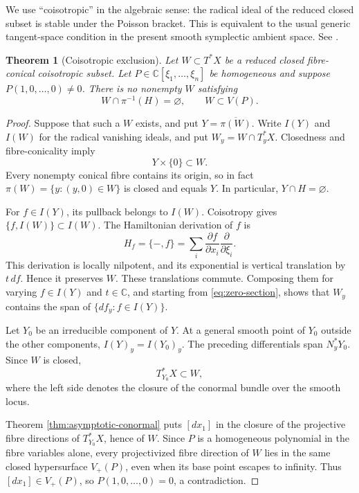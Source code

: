 \documentclass[11pt]{amsart}
\newtheorem{theorem}{Theorem}[section]
\theoremstyle{definition}
\begin{document}
We use ``coisotropic'' in the algebraic sense: the radical ideal of the
reduced closed subset is stable under the Poisson bracket. This is equivalent
to the usual generic tangent-space condition in the present smooth symplectic
ambient space. See \cite[Lemma~11.9]{SchnellNotes}.

\begin{theorem}[Coisotropic exclusion]\label{thm:coisotropic-exclusion}
Let $W\subset T^*X$ be a reduced closed fibre-conical coisotropic subset. Let
$P\in \mathbb C[\xi_1,\ldots,\xi_n]$ be homogeneous and suppose
$P(1,0,\ldots,0)\neq0$.
There is no nonempty $W$ satisfying
\[
 W\cap\pi^{-1}(H)=\varnothing,\qquad W\subset V(P).
\]
\end{theorem}

\begin{proof}
Suppose that such a $W$ exists, and put $Y=\overline{\pi(W)}$. Write $I(Y)$
and $I(W)$ for the radical vanishing ideals, and put
$W_y=W\cap T_y^*X$. Closedness and
fibre-conicality imply
\[
 Y\times\{0\}\subset W.
 \tag{5.1}\label{eq:zero-section}
\]
Every nonempty conical fibre contains its origin, so in fact
$\pi(W)=\{y:(y,0)\in W\}$ is closed and equals $Y$. In particular,
$Y\cap H=\varnothing$.

For $f\in I(Y)$, its pullback belongs to $I(W)$. Coisotropy gives
$\{f,I(W)\}\subset I(W)$. The Hamiltonian derivation of $f$ is
\[
 H_f=\{-,f\}=\sum_i\frac{\partial f}{\partial x_i}
 \frac{\partial}{\partial\xi_i}.
\]
This derivation is locally nilpotent, and its exponential is vertical
translation by $t\,df$. Hence it preserves $W$. These translations commute.
Composing them for varying $f\in I(Y)$ and $t\in\mathbb C$, and starting from
\eqref{eq:zero-section}, shows that $W_y$ contains the span of
$\{df_y:f\in I(Y)\}$.

Let $Y_0$ be an irreducible component of $Y$. At a general smooth point of
$Y_0$ outside the other components, $I(Y)_y=I(Y_0)_y$. The preceding
differentials span $N_y^*Y_0$. Since $W$ is closed,
\[
 T^*_{Y_0}X\subset W,
 \tag{5.2}\label{eq:conormal-in-W}
\]
where the left side denotes the closure of the conormal bundle over the smooth
locus.

Theorem \ref{thm:asymptotic-conormal} puts $[dx_1]$ in the closure of the
projective fibre directions of $T^*_{Y_0}X$, hence of $W$. Since $P$ is a
homogeneous polynomial in the fibre variables alone, every projectivized
fibre direction of $W$ lies in the same closed hypersurface $V_+(P)$, even
when its base point escapes to infinity. Thus $[dx_1]\in V_+(P)$, so
$P(1,0,\ldots,0)=0$, a contradiction.
\end{proof}
\end{document}
